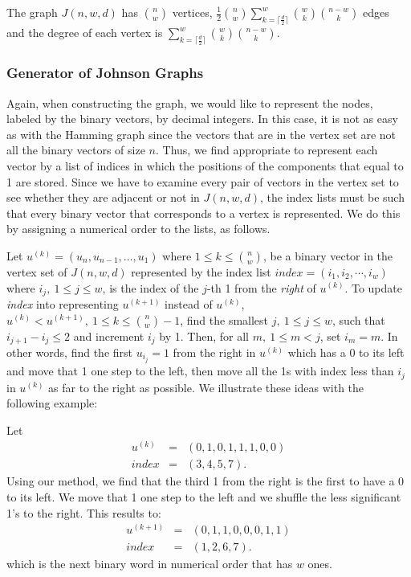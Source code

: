 The graph $J(n,w,d)$ has $n \choose w$ vertices, $\frac{1}{2} {n \choose w}
\sum_{k=\lceil \frac{d}{2} \rceil}^{w} {w \choose k} {n-w \choose k}$
edges and the degree of each vertex is $\sum_{k=\lceil \frac{d}{2}
\rceil}^{w} {w \choose k} {n-w \choose k}$.

\subsubsection{Generator of Johnson Graphs}

Again, when constructing the graph, we would like to represent the
nodes, labeled by the binary vectors, by decimal integers. In this
case, it is not as easy as with the Hamming graph since the vectors
that are in the vertex set are not all the binary vectors of size $n$.
Thus, we find appropriate to represent each vector by a list of indices in which
the positions of the components that equal to 1 are stored.
Since we have to examine every pair of vectors in the vertex set to see
whether they are adjacent or not in $J(n,w,d)$, the index lists must be
such that every binary vector that corresponds to a vertex is represented.
We do this by assigning a numerical order to the lists, as follows.

Let $u^{(k)}=(u_{n},u_{n-1},\ldots ,u_{1})$ where $1
\leq k \leq {n \choose w}$, be a binary vector in the vertex set of
$J(n,w,d)$ represented by the index list $index = (i_{1},i_{2},\cdots
,i_{w})$ where $i_{j},\ 1 \leq j
\leq w$, is the index of the $j$-th 1 from the {\em right} of $u^{(k)}$.
To update {\em index} into representing $u^{(k+1)}$ instead of
$u^{(k)}$, $u^{(k)} < u^{(k+1)},\ 1 \leq k \leq {n \choose w}-1$, find
the smallest $j,\ 1 \leq j \leq w$, such that
$i_{j+1}-i_{j} \leq 2$ and increment $i_{j}$ by 1. Then,
for all $m,\ 1 \leq m < j$, set $i_{m} = m$. In other words, find the
first $u_{i_{j}} = 1$ from the right in $u^{(k)}$ which has a 0 to its
left and move that 1 one step to the left, then move all the 1s with index
less than $i_{j}$ in $u^{(k)}$ as far to the right as possible. We illustrate
these ideas with the following example:

{\rm Let}
\begin{eqnarray*}
   u^{(k)} & = & (0,1,0,1,1,1,0,0) \\ index & = & (3,4,5,7).
\end{eqnarray*}
{\rm Using our method, we find that the third 1 from the right is the
first to have a 0 to its left. We move that 1 one step to the left and
we shuffle the less significant 1's to the right. This results to:}
\begin{eqnarray*}
   u^{(k+1)} & = & (0,1,1,0,0,0,1,1) \\ index & = & (1,2,6,7).
\end{eqnarray*}
{\rm which is the next binary word in numerical order that has $w$ ones.}

